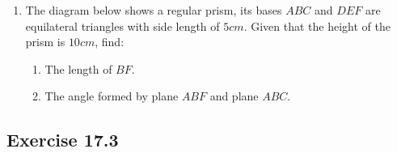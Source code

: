 \documentclass{report}
\begin{document}
\begin{multicols}{2}
\begin{enumerate}
        \item The diagram below shows a regular prism, its bases $ABC$ and $DEF$ are
              equilateral triangles with side length of $5cm$. Given that the height of the
              prism is $10cm$, find:
              \begin{enumerate}
                  \item The length of $BF$.
                  \item The angle formed by plane $ABF$ and plane $ABC$.
              \end{enumerate}
    \end{enumerate}

    \subsection{Exercise 17.3}


\end{multicols}
\end{document}
